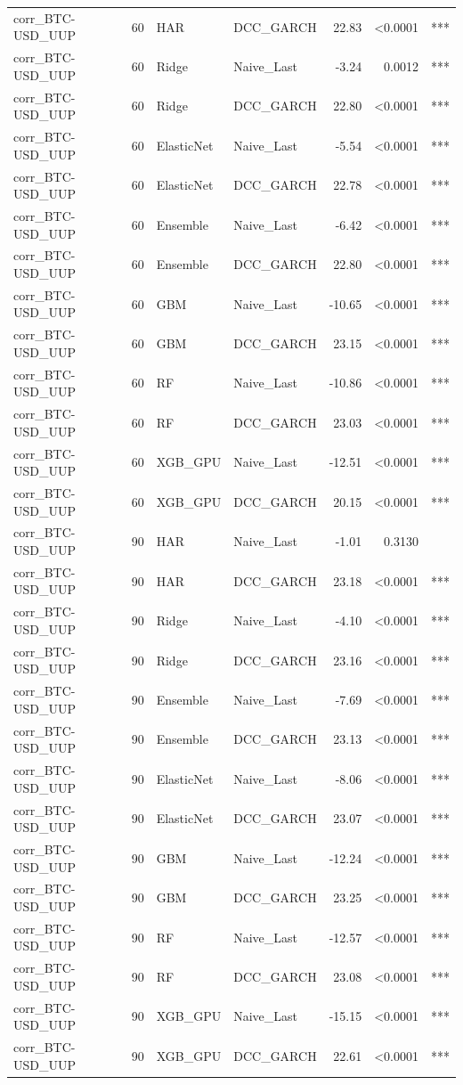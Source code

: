 \begin{table}[H]
\begin{tabular}{llllrrl}
corr_BTC-USD_UUP & 60 & HAR & DCC_GARCH & 22.83 & <0.0001 & *** \\
corr_BTC-USD_UUP & 60 & Ridge & Naive_Last & -3.24 & 0.0012 & *** \\
corr_BTC-USD_UUP & 60 & Ridge & DCC_GARCH & 22.80 & <0.0001 & *** \\
corr_BTC-USD_UUP & 60 & ElasticNet & Naive_Last & -5.54 & <0.0001 & *** \\
corr_BTC-USD_UUP & 60 & ElasticNet & DCC_GARCH & 22.78 & <0.0001 & *** \\
corr_BTC-USD_UUP & 60 & Ensemble & Naive_Last & -6.42 & <0.0001 & *** \\
corr_BTC-USD_UUP & 60 & Ensemble & DCC_GARCH & 22.80 & <0.0001 & *** \\
corr_BTC-USD_UUP & 60 & GBM & Naive_Last & -10.65 & <0.0001 & *** \\
corr_BTC-USD_UUP & 60 & GBM & DCC_GARCH & 23.15 & <0.0001 & *** \\
corr_BTC-USD_UUP & 60 & RF & Naive_Last & -10.86 & <0.0001 & *** \\
corr_BTC-USD_UUP & 60 & RF & DCC_GARCH & 23.03 & <0.0001 & *** \\
corr_BTC-USD_UUP & 60 & XGB_GPU & Naive_Last & -12.51 & <0.0001 & *** \\
corr_BTC-USD_UUP & 60 & XGB_GPU & DCC_GARCH & 20.15 & <0.0001 & *** \\
corr_BTC-USD_UUP & 90 & HAR & Naive_Last & -1.01 & 0.3130 &  \\
corr_BTC-USD_UUP & 90 & HAR & DCC_GARCH & 23.18 & <0.0001 & *** \\
corr_BTC-USD_UUP & 90 & Ridge & Naive_Last & -4.10 & <0.0001 & *** \\
corr_BTC-USD_UUP & 90 & Ridge & DCC_GARCH & 23.16 & <0.0001 & *** \\
corr_BTC-USD_UUP & 90 & Ensemble & Naive_Last & -7.69 & <0.0001 & *** \\
corr_BTC-USD_UUP & 90 & Ensemble & DCC_GARCH & 23.13 & <0.0001 & *** \\
corr_BTC-USD_UUP & 90 & ElasticNet & Naive_Last & -8.06 & <0.0001 & *** \\
corr_BTC-USD_UUP & 90 & ElasticNet & DCC_GARCH & 23.07 & <0.0001 & *** \\
corr_BTC-USD_UUP & 90 & GBM & Naive_Last & -12.24 & <0.0001 & *** \\
corr_BTC-USD_UUP & 90 & GBM & DCC_GARCH & 23.25 & <0.0001 & *** \\
corr_BTC-USD_UUP & 90 & RF & Naive_Last & -12.57 & <0.0001 & *** \\
corr_BTC-USD_UUP & 90 & RF & DCC_GARCH & 23.08 & <0.0001 & *** \\
corr_BTC-USD_UUP & 90 & XGB_GPU & Naive_Last & -15.15 & <0.0001 & *** \\
corr_BTC-USD_UUP & 90 & XGB_GPU & DCC_GARCH & 22.61 & <0.0001 & *** \\
\bottomrule
\end{tabular}
\end{table}